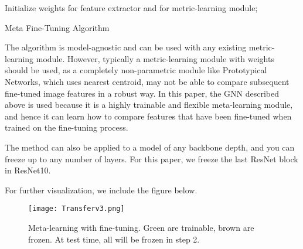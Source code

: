 \documentclass[10pt,twocolumn,letterpaper]{article}
\begin{document}
\begin{algorithm}[h]
\SetAlgoLined
 Initialize weights  for feature extractor and  for metric-learning module; \\ 
 \caption{Meta Fine-Tuning Algorithm}
\end{algorithm}

The algorithm is model-agnostic and can be used with any existing metric-learning module.  However, typically a metric-learning module with weights should be used, as a completely non-parametric module like Prototypical Networks, which uses nearest centroid, may not be able to compare subsequent fine-tuned image features in a robust way. In this paper, the GNN described above is used because it is a highly trainable and flexible meta-learning module, and hence it can learn how to compare features that have been fine-tuned when trained on the fine-tuning process.

The method can also be applied to a model of any backbone depth, and you can freeze up to any number of layers. For this paper, we freeze the last ResNet block in ResNet10.

For further visualization, we include the figure below.

\begin{figure}[h]
\begin{center}
   \texttt{[image: Transferv3.png]}
\end{center}
   \caption{Meta-learning with fine-tuning. Green are trainable, brown are frozen. At test time, all will be frozen in step 2. }
\label{fig:long}
\label{fig:onecol}
\end{figure}
\end{document}
